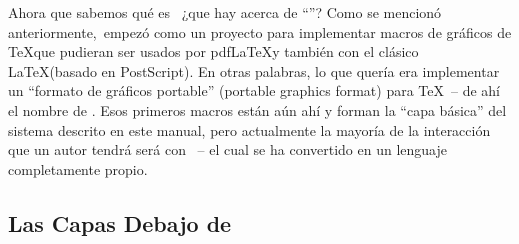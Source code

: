 Ahora que sabemos qué es \tikzname\ ¿que hay acerca de ``\pgfname''? Como se
mencionó anteriormente,\tikzname\ empezó como un proyecto para implementar
macros de gráficos de \TeX que pudieran ser usados por pdf\LaTeX y también con
el clásico \LaTeX (basado en PostScript). En otras palabras, lo que quería era
implementar un ``formato de gráficos portable'' (portable graphics format) para
\TeX\ -- de ahí el nombre de \pgfname. Esos primeros macros están aún ahí y
forman la ``capa básica'' del sistema descrito en este manual, pero actualmente
la mayoría de la interacción que un autor tendrá será con \tikzname\ -- el cual
se ha convertido en un lenguaje completamente propio.


\subsection{Las Capas Debajo de \tikzname}

